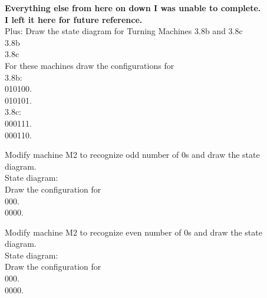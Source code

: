\documentclass[12pt]{article}
\begin{document}
\textbf{Everything else from here on down I was unable to complete. \\
I left it here for future reference.} \\

Plus: Draw the state diagram for Turning Machines 3.8b and 3.8c \\
3.8b \\

3.8c \\

For these machines draw the configurations for \\
3.8b: \\
010100. \\

010101. \\

3.8c: \\
000111. \\

000110. \\

\pagebreak

Modify machine M2 to recognize odd number of 0s and draw the state \\
diagram. \\

State diagram: \\

Draw the configuration for \\
000. \\

0000. \\

\pagebreak

Modify machine M2 to recognize even number of 0s and draw the state \\
diagram. \\

State diagram: \\

Draw the configuration for \\
000. \\

0000. \\
\end{document}
